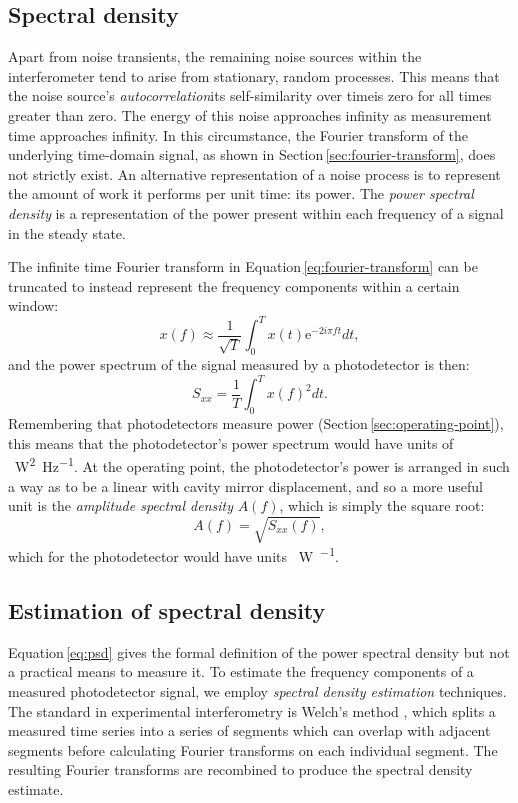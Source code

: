 \subsection{Spectral density}
Apart from noise transients, the remaining noise sources within the interferometer tend to arise from stationary, random processes. This means that the noise source's \emph{autocorrelation}\textemdash its self-similarity over time\textemdash is zero for all times greater than zero. The energy of this noise approaches infinity as measurement time approaches infinity. In this circumstance, the Fourier transform of the underlying time-domain signal, as shown in Section\,\ref{sec:fourier-transform}, does not strictly exist. An alternative representation of a noise process is to represent the amount of work it performs per unit time: its power. The \emph{power spectral density} is a representation of the power present within each frequency of a signal in the steady state.

The infinite time Fourier transform in Equation\,\ref{eq:fourier-transform} can be truncated to instead represent the frequency components within a certain window:
\begin{equation}
  x \left( f \right) \approx \frac{1}{\sqrt{T}} \int^{T}_{0} x \left( t \right) \text{e}^{-2i \pi f t} dt,
\end{equation}
and the power spectrum of the signal measured by a photodetector is then:
\begin{equation}
  \label{eq:psd}
  S_{xx} = \frac{1}{T} \int^{T}_{0} x \left( f \right)^2 dt.
\end{equation}
Remembering that photodetectors measure power (Section\,\ref{sec:operating-point}), this means that the photodetector's power spectrum would have units of \SI{}{\watt^2\per\hertz}. At the operating point, the photodetector's power is arranged in such a way as to be a linear with cavity mirror displacement, and so a more useful unit is the \emph{amplitude spectral density} $A \left( f \right)$, which is simply the square root:
\begin{equation}
  A \left( f \right) = \sqrt{S_{xx} \left( f \right)},
\end{equation}
which for the photodetector would have units \SI{}{\watt\per\sqrthz}.

\subsection{\label{sec:windowing}Estimation of spectral density}
Equation\,\ref{eq:psd} gives the formal definition of the power spectral density but not a practical means to measure it. To estimate the frequency components of a measured photodetector signal, we employ \emph{spectral density estimation} techniques. The standard in experimental interferometry is Welch's method \cite{Welch1967}, which splits a measured time series into a series of segments which can overlap with adjacent segments before calculating Fourier transforms on each individual segment. The resulting Fourier transforms are recombined to produce the spectral density estimate.

